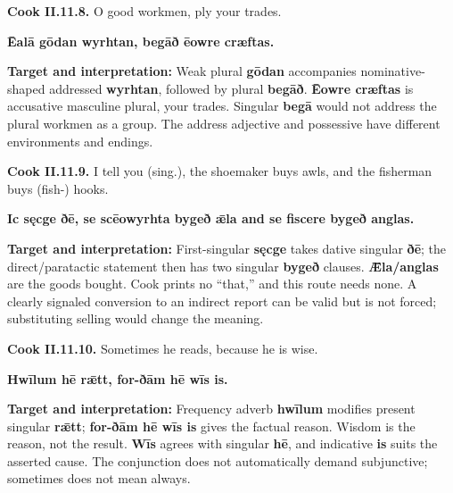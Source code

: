 \par\begin{minipage}{\linewidth}\raggedright
\textbf{Cook II.11.8.} O good workmen, ply your trades.

\textbf{Ēalā gōdan wyrhtan, begāð ēowre cræftas.}

\textbf{Target and interpretation:} Weak plural \textbf{gōdan} accompanies nominative-shaped addressed \textbf{wyrhtan}, followed by plural \textbf{begāð}. \textbf{Ēowre cræftas} is accusative masculine plural, your trades. Singular \textbf{begā} would not address the plural workmen as a group. The address adjective and possessive have different environments and endings.

\end{minipage}\par\addvspace{4pt}

\par\begin{minipage}{\linewidth}\raggedright
\textbf{Cook II.11.9.} I tell you (sing.), the shoemaker buys awls, and the fisherman buys (fish-) hooks.

\textbf{Ic sęcge ðē, se scēowyrhta bygeð ǣla and se fiscere bygeð anglas.}

\textbf{Target and interpretation:} First-singular \textbf{sęcge} takes dative singular \textbf{ðē}; the direct/\allowbreak{}paratactic statement then has two singular \textbf{bygeð} clauses. \textbf{Ǣla/\allowbreak{}anglas} are the goods bought. Cook prints no “that,” and this route needs none. A clearly signaled conversion to an indirect report can be valid but is not forced; substituting selling would change the meaning.

\end{minipage}\par\addvspace{4pt}

\par\begin{minipage}{\linewidth}\raggedright
\textbf{Cook II.11.10.} Sometimes he reads, because he is wise.

\textbf{Hwīlum hē rǣtt, for-ðām hē wīs is.}

\textbf{Target and interpretation:} Frequency adverb \textbf{hwīlum} modifies present singular \textbf{rǣtt}; \textbf{for-ðām hē wīs is} gives the factual reason. Wisdom is the reason, not the result. \textbf{Wīs} agrees with singular \textbf{hē}, and indicative \textbf{is} suits the asserted cause. The conjunction does not automatically demand subjunctive; sometimes does not mean always.

\end{minipage}\par\addvspace{4pt}

